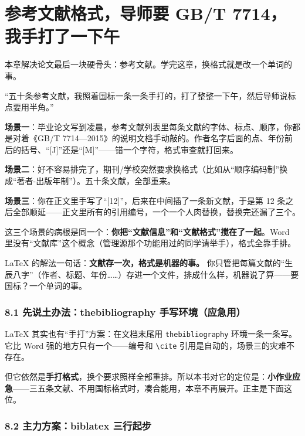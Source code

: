 \chapter{参考文献格式，导师要 GB/T 7714，我手打了一下午}

\begin{notebox}
本章解决论文最后一块硬骨头：参考文献。学完这章，换格式就是改一个单词的事。
\end{notebox}


“五十条参考文献，我照着国标一条一条手打的，打了整整一下午，然后导师说标点要用半角。”


\textbf{场景一}：毕业论文写到凌晨，参考文献列表里每条文献的字体、标点、顺序，你都是对着《GB/T 7714—2015》的说明文档手动敲的。作者名字后面的点、年份前后的括号、“[J]”还是“[M]”——错一个字符，格式审查就打回来。

\textbf{场景二}：好不容易排完了，期刊/学校突然要求换格式（比如从“顺序编码制”换成“著者-出版年制”）。五十条文献，全部重来。

\textbf{场景三}：你在正文里手写了“[12]”，后来在中间插了一条新文献，于是第 12 条之后全部顺延——正文里所有的引用编号，一个一个人肉替换，替换完还漏了三个。

这三个场景的病根是同一个：\textbf{你把“文献信息”和“文献格式”搅在了一起}。Word 里没有“文献库”这个概念（管理源那个功能用过的同学请举手），格式全靠手排。

LaTeX 的解法一句话：\textbf{文献存一次，格式是机器的事。} 你只管把每篇文献的“生辰八字”（作者、标题、年份……）存进一个文件，排成什么样，机器说了算——要国标？一个单词的事。


\subsection*{8.1 先说土办法：thebibliography 手写环境（应急用）}

LaTeX 其实也有“手打”方案：在文档末尾用 \texttt{thebibliography} 环境一条一条写。它比 Word 强的地方只有一个——编号和 \texttt{\textbackslash{}cite} 引用是自动的，场景三的灾难不存在。

但它依然是\textbf{手打格式}，换个要求照样全部重排。所以本书对它的定位是：\textbf{小作业应急}——三五条文献、不用国标格式时，凑合能用，本章不再展开。正主是下面这位。

\subsection*{8.2 主力方案：biblatex 三行起步}

